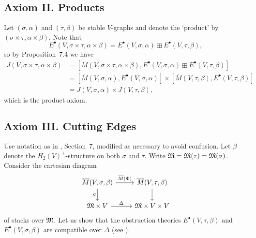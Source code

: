 \documentclass{article}
\newcommand{\com}{^{\scriptscriptstyle\bullet}}
\newcommand{\MM}{{\frak M}}
\newcommand{\ol}{\overline}
\newcommand{\ldiag}[1]%
       {\makebox[0cm]{${\scriptstyle#1}\downarrow\phantom{\scriptstyle#1}$}}
\newcommand{\rdiag}[1]%
       {\makebox[0cm]{$\phantom{\scriptstyle#1}\downarrow{\scriptstyle#1}$}}
\newcommand{\comdia}[9]{%
\begin{array}{ccc}
#1 & \stackrel{#2}{\longrightarrow} & #3 \\
\ldiag{#4} & #5 & \rdiag{#6} \\
#7 & \stackrel{#8}{\longrightarrow} & #9
\end{array}}
\begin{document}
\subsection{{\sc Axiom II.} Products}

Let $(\sigma,\alpha)$ and $(\tau,\beta)$ be stable $V$-graphs and
denote the `product' by $(\sigma\times\tau,\alpha\times\beta)$.
Note that
\[E\com(V,\sigma\times\tau,\alpha\times\beta) =
E\com(V,\sigma,\alpha)\boxplus E\com(V,\tau,\beta),\]
so by \cite{BF} Proposition~7.4 we have
\begin{align*}
J(V,\sigma\times\tau,\alpha\times\beta) & =
[\ol{M}(V,\sigma\times\tau,\alpha\times\beta),
E\com(V,\sigma,\alpha)\boxplus E\com(V,\tau,\beta)]  \\
& = [\ol{M}(V,\sigma,\alpha),E\com(V,\sigma,\alpha)] \times
[\ol{M}(V,\tau,\beta),E\com(V,\tau,\beta)] \\
& = J(V,\sigma,\alpha)\times J(V,\tau,\beta),
\end{align*}
which is the product axiom.

\subsection{{\sc Axiom III.} Cutting Edges}

Use notation as in \cite{BM}, Section~7, modified as necessary to
avoid confusion. Let $\beta$ denote the $H_2(V)^+$-structure on both
$\sigma$ and $\tau$. Write $\MM=\MM(\tau)=\MM(\sigma)$. Consider the
cartesian diagram
\[\begin{tikzcd}
\ol{M}(V,\sigma,\beta) \rar["\ol{M}(\Phi)"] \dar["g"']
& \ol{M}(V,\tau,\beta) \dar \\ 
\MM\times V \rar["\Delta"] & \MM\times V\times V
\end{tikzcd}\]
of stacks over $\MM$. Let us show that the obstruction theories
$E\com(V,\tau,\beta)$ and $E\com(V,\sigma,\beta)$ are compatible over
$\Delta$ (see \cite{BF}).
\end{document}
